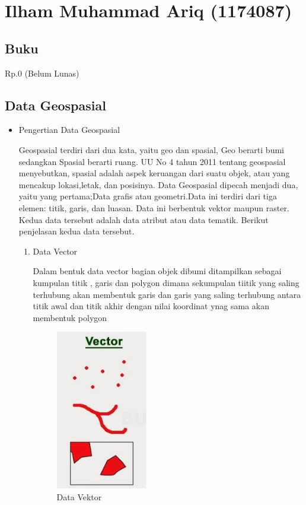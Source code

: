 \section{Ilham Muhammad Ariq (1174087)}
\subsection{Buku}
Rp.0 (Belum Lunas)
\subsection{Data Geospasial}
\begin{itemize}
	\item Pengertian Data Geospasial
	\par Geospasial terdiri dari dua kata, yaitu geo dan spasial, Geo berarti bumi sedangkan Spasial berarti ruang. UU No 4 tahun 2011 tentang geospasial menyebutkan, spasial adalah aspek keruangan dari suatu objek, atau yang mencakup lokasi,letak, dan posisinya. Data Geospasial dipecah menjadi dua, yaitu yang pertama;Data grafis atau geometri.Data ini terdiri dari tiga elemen: titik, garis, dan luasan. Data ini berbentuk vektor maupun raster. Kedua data tersebut adalah data atribut atau data tematik. Berikut penjelasan kedua data tersebut.
	
	\begin{enumerate}
	\item Data Vector
	\par Dalam bentuk data vector bagian objek dibumi ditampilkan sebagai kumpulan titik , garis dan polygon dimana sekumpulan tiitik yang saling terhubung akan membentuk garis dan garis yang saling terhubung antara titik awal dan titik akhir dengan nilai koordinat ynag sama akan membentuk polygon

	\begin{figure}[H]
	\includegraphics[width=4cm]{figures/Tugas1/1174087/vektor.png}
	\centering
	\caption{Data Vektor}
	\end{figure}
	

\end{enumerate}
\end{itemize}
